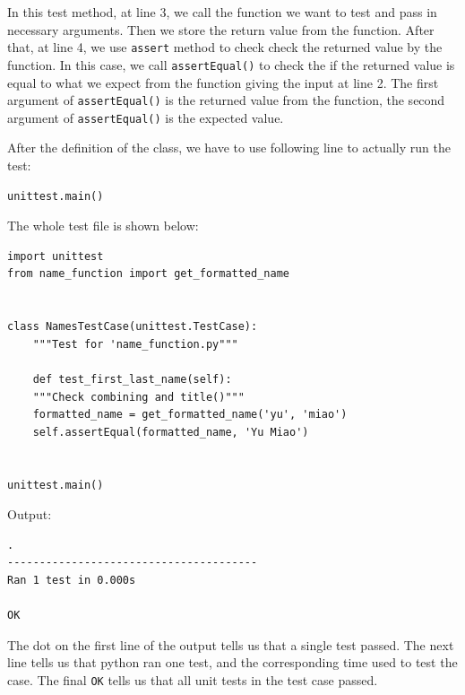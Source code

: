\documentclass[12pt]{book}
\begin{document}
In this test method, at line 3, we call the function we want to test and pass in necessary arguments. Then we store the return value from the function. After that, at line 4, we use \texttt{assert} method to check check the returned value by the function. In this case, we call \texttt{assertEqual()} to check the if the returned value is equal to what we expect from the function giving the input at line 2. The first argument of \texttt{assertEqual()} is the returned value from the function, the second argument of \texttt{assertEqual()} is the expected value.

After the definition of the class, we have to use following line to actually run the test:
\begin{verbatim}
unittest.main()
\end{verbatim}

The whole test file is shown below:
\begin{verbatim}
import unittest
from name_function import get_formatted_name


class NamesTestCase(unittest.TestCase):
    """Test for 'name_function.py"""

    def test_first_last_name(self):
	"""Check combining and title()"""
	formatted_name = get_formatted_name('yu', 'miao')
	self.assertEqual(formatted_name, 'Yu Miao')


unittest.main()
\end{verbatim}
Output:
\begin{verbatim}
.
---------------------------------------
Ran 1 test in 0.000s

OK
\end{verbatim}
The dot on the first line of the output tells us that a single test passed. The next line tells us that python ran one test, and the corresponding time used to test the case. The final \texttt{OK} tells us that all unit tests in the test case passed.
\end{document}
